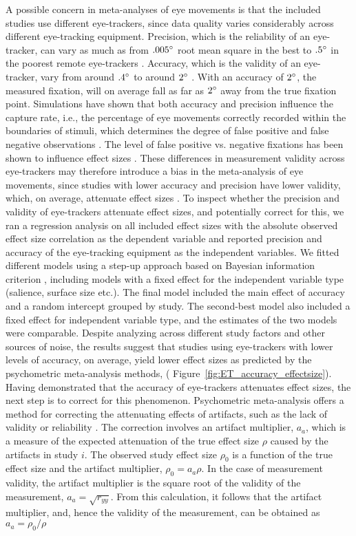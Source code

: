 A possible concern in meta-analyses of eye movements is that the included studies use different eye-trackers, since data quality varies considerably across different eye-tracking equipment. Precision, which is the reliability of an eye-tracker, can vary as much as from $.005\degree$ root mean square in the best to $.5\degree$ in the poorest remote eye-trackers \citep{holmqvist2015a}. Accuracy, which is the validity of an eye-tracker, vary from around $.4\degree$ to around $2\degree$ \citep{holmqvist2015a}. With an accuracy of $2\degree$, the measured fixation, will on average fall as far as $2\degree$ away from the true fixation point. Simulations have shown that both accuracy and precision influence the capture rate, i.e., the percentage of eye movements correctly recorded within the boundaries of stimuli, which determines the degree of false positive and false negative observations \citep{orquin2019a}. The level of false positive vs. negative fixations has been shown to influence effect sizes \citep{orquin2016a}. These differences in measurement validity across eye-trackers may therefore introduce a bias in the meta-analysis of eye movements, since studies with lower accuracy and precision have lower validity, which, on average, attenuate effect sizes \citep{hunter2004a}. To inspect whether the precision and validity of eye-trackers attenuate effect sizes, and potentially correct for this, we ran a regression analysis on all included effect sizes with the absolute observed effect size correlation as the dependent variable and reported precision and accuracy of the eye-tracking equipment as the independent variables. We fitted different models using a step-up approach \citep{ryoo2011model} based on Bayesian information criterion \citep{Schwarz1978}, including models with a fixed effect for the independent variable type (salience, surface size etc.). The final model included the main effect of accuracy and a random intercept grouped by study. The second-best model also included a fixed effect for independent variable type, and the estimates of the two models were comparable. Despite analyzing across different study factors and other sources of noise, the results suggest that studies using eye-trackers with lower levels of accuracy, on average, yield lower effect sizes as predicted by the psychometric meta-analysis methods, ( Figure~\ref{fig:ET_accuracy_effectsize}). Having demonstrated that the accuracy of eye-trackers attenuates effect sizes, the next step is to correct for this phenomenon. Psychometric meta-analysis offers a method for correcting the attenuating effects of artifacts, such as the lack of validity or reliability \citep{hunter2004a}. The correction involves an artifact multiplier, $a_a$, which is a measure of the expected attenuation of the true effect size $\rho$ caused by the artifacts in study $i$. The observed study effect size $\rho_0$ is a function of the true effect size and the artifact multiplier, $\rho_0 = a_a \rho$. In the case of measurement validity, the artifact multiplier is the square root of the validity of the measurement, $a_a = \sqrt{r_{yy}}$. From this calculation, it follows that the artifact multiplier, and, hence the validity of the measurement, can be obtained as $a_a = \rho_0 / \rho$ 
